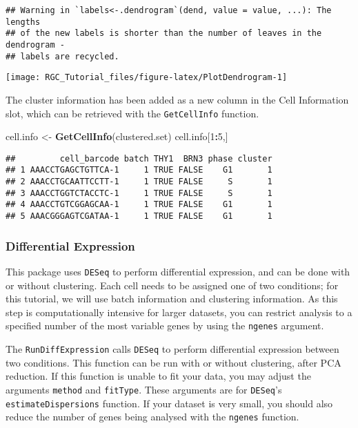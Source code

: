 \documentclass[]{article}
\newenvironment{Shaded}{\begin{snugshade}}{\end{snugshade}}
\newcommand{\DecValTok}[1]{\textcolor[rgb]{0.00,0.00,0.81}{#1}}
\newcommand{\KeywordTok}[1]{\textcolor[rgb]{0.13,0.29,0.53}{\textbf{#1}}}
\newcommand{\NormalTok}[1]{#1}
\newcommand{\OperatorTok}[1]{\textcolor[rgb]{0.81,0.36,0.00}{\textbf{#1}}}
\newcommand{\StringTok}[1]{\textcolor[rgb]{0.31,0.60,0.02}{#1}}
\begin{document}
\begin{verbatim}
## Warning in `labels<-.dendrogram`(dend, value = value, ...): The lengths
## of the new labels is shorter than the number of leaves in the dendrogram -
## labels are recycled.
\end{verbatim}

\begin{center}\texttt{[image: RGC\_Tutorial\_files/figure-latex/PlotDendrogram-1]} \end{center}

The cluster information has been added as a new column in the Cell
Information slot, which can be retrieved with the \texttt{GetCellInfo}
function.

\begin{Shaded}
\begin{Highlighting}[]
\NormalTok{cell.info <-}\StringTok{ }\KeywordTok{GetCellInfo}\NormalTok{(clustered.set)}
\NormalTok{cell.info[}\DecValTok{1}\OperatorTok{:}\DecValTok{5}\NormalTok{,]}
\end{Highlighting}
\end{Shaded}

\begin{verbatim}
##         cell_barcode batch THY1  BRN3 phase cluster
## 1 AAACCTGAGCTGTTCA-1     1 TRUE FALSE    G1       1
## 2 AAACCTGCAATTCCTT-1     1 TRUE FALSE     S       1
## 3 AAACCTGGTCTACCTC-1     1 TRUE FALSE     S       1
## 4 AAACCTGTCGGAGCAA-1     1 TRUE FALSE    G1       1
## 5 AAACGGGAGTCGATAA-1     1 TRUE FALSE    G1       1
\end{verbatim}

\hypertarget{differential-expression}{%
\subsubsection{Differential Expression}\label{differential-expression}}

This package uses \texttt{DESeq} to perform differential expression, and
can be done with or without clustering. Each cell needs to be assigned
one of two conditions; for this tutorial, we will use batch information
and clustering information. As this step is computationally intensive
for larger datasets, you can restrict analysis to a specified number of
the most variable genes by using the \texttt{ngenes} argument.

The \texttt{RunDiffExpression} calls \texttt{DESeq} to perform
differential expression between two conditions. This function can be run
with or without clustering, after PCA reduction. If this function is
unable to fit your data, you may adjust the arguments \texttt{method}
and \texttt{fitType}. These arguments are for \texttt{DESeq}'s
\texttt{estimateDispersions} function. If your dataset is very small,
you should also reduce the number of genes being analysed with the
\texttt{ngenes} function.
\end{document}
